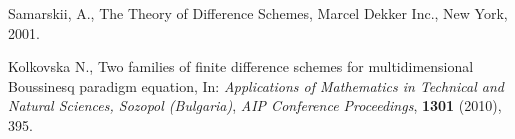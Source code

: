 \documentclass{article}
\begin{document}
\begin{thebibliography}{99}

 Samarskii, A., The Theory of Difference Schemes, Marcel Dekker Inc., New York, 2001.

 Kolkovska N., Two families of finite difference schemes for multidimensional Boussinesq paradigm equation, In:
{\it Applications of Mathematics in Technical and Natural Sciences,  Sozopol (Bulgaria)},
\emph{AIP Conference Proceedings}, \textbf{1301} (2010), 395.

\end{thebibliography}
\end{document}
